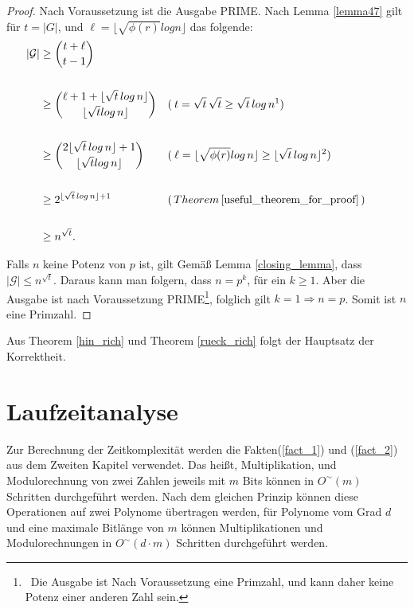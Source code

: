 \documentclass[12pt,oneside]{article}
\theoremstyle{remark}
\theoremstyle{definition}
\begin{document}
\smallskip

\begin{proof}
Nach Voraussetzung ist die Ausgabe PRIME. Nach Lemma \ref{lemma47} gilt für $t = |G|$, und $\ell = \lfloor \sqrt{\phi(r)} log n \rfloor$ das folgende:\newline
\begin{align*}
|\mathcal{G}| & \geq {t + \ell \choose t - 1} \\
\\
& \geq {\ell + 1 + \lfloor \sqrt{t} \, log \, n \rfloor \choose \lfloor \sqrt{t} log \, n \rfloor} && ( \: t = \sqrt{t} \,
\sqrt{t} \geq \sqrt{t} \,  log \, n\text{\footnotemark}) && \\
\\
& \geq {2 \lfloor \sqrt{t} \, log \,  n \rfloor + 1 \choose \lfloor \sqrt{t} log \, n \rfloor} && ( \: \ell = \lfloor \sqrt{\phi(r)} log \, n \rfloor \geq \lfloor \sqrt{t} \, log \, n \rfloor\text{\footnotemark})\\
\\
&\geq 2^{\lfloor \sqrt{t} \, log \, n \rfloor + 1} &&(\,  Theorem \,  \ref{useful_theorem_for_proof} \, )\\
\\
&\geq n^{\sqrt{t}}.
\end{align*}

\addtocounter{footnote}{-1}


Falls $n$ keine Potenz von $p$ ist, gilt Gemäß Lemma \ref{closing_lemma}, dass $|\mathcal{G}| \leq n^{\sqrt{t}}$. Daraus kann man folgern, dass $n = p^k$, für ein $k \geq 1$. Aber die Ausgabe ist nach Voraussetzung PRIME\footnote{ $\,$ Die Ausgabe ist Nach Voraussetzung eine Primzahl, und kann daher keine Potenz einer anderen Zahl sein.}, folglich gilt $ k= 1 \Rightarrow n = p$. Somit ist $n$ eine Primzahl.
\end{proof}

Aus Theorem \ref{hin_rich} und Theorem \ref{rueck_rich} folgt der Hauptsatz der Korrektheit.
\newpage
\section{Laufzeitanalyse}
Zur Berechnung der Zeitkomplexität werden die Fakten(\ref{fact_1}) und (\ref{fact_2}) aus dem Zweiten Kapitel verwendet. Das heißt, Multiplikation, und Modulorechnung von zwei Zahlen jeweils mit $m$ Bits können in $O^{\sim}( m )$ Schritten durchgeführt werden. Nach dem gleichen Prinzip können diese Operationen auf zwei Polynome übertragen werden, für Polynome vom Grad $d$ und eine maximale Bitlänge von  $m$ können Multiplikationen und Modulorechnungen in $O^{\sim}(d \cdot  m )$ Schritten durchgeführt werden.
\end{document}
